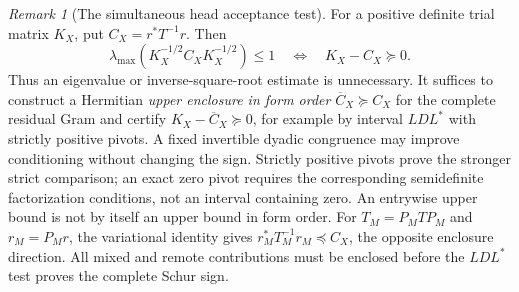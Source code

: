 \documentclass[11pt]{article}
\theoremstyle{remark}
\newtheorem{remark}[theorem]{Remark}
\begin{document}
\begin{remark}[The simultaneous head acceptance test]
\label{rem:v122-head-ldl}
For a positive definite trial matrix $K_X$, put
$C_X=r^*T^{-1}r$. Then
\[
 \lambda_{\max}(K_X^{-1/2}C_XK_X^{-1/2})\le1
 \quad\Longleftrightarrow\quad K_X-C_X\succeq0.
\]
Thus an eigenvalue or inverse-square-root estimate is unnecessary.
It suffices to construct a Hermitian \emph{upper enclosure in form
order} $\overline C_X\succeq C_X$ for the complete residual Gram
and certify $K_X-\overline C_X\succeq0$, for example by interval
$LDL^*$ with strictly positive pivots. A fixed invertible dyadic
congruence may improve conditioning without changing the sign.
Strictly positive pivots prove the stronger strict comparison;
an exact zero pivot requires the corresponding semidefinite
factorization conditions, not an interval containing zero.
An entrywise upper bound is not by itself an upper bound in form
order. For $T_M=P_MT P_M$ and $r_M=P_Mr$, the variational identity
gives $r_M^*T_M^{-1}r_M\preceq C_X$, the opposite enclosure
direction. All mixed and remote contributions must be enclosed
before the $LDL^*$ test proves the complete Schur sign.
\end{remark}
\end{document}
